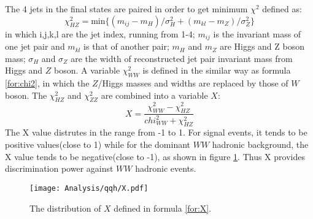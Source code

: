 The 4 jets in the final states are paired in order to get minimum $\chi^2$ defined as:
\begin{equation}
     \chi^2_{HZ} = \mathrm{min}\{(m_{ij}-m_H)/\sigma^2_{H} + (m_{kl}-m_Z)/\sigma^2_{Z} \}
     \label{for:chi2}
\end{equation}
in which i,j,k,l are the jet index, running from 1-4; $m_{ij}$ is the invariant mass of one jet pair and $m_{kl}$ is that of another pair; $m_H$ and $m_Z$ are Higgs and Z boson mass; $\sigma_H$ and $\sigma_Z$ are the width of reconstructed jet pair invariant mass from Higgs and  $Z$ boson. A variable $\chi^2_{WW}$ is defined in the similar way as formula \ref{for:chi2}, in which the $Z$/Higgs masses and widths are replaced by those of $W$ boson. The $\chi^2_{HZ}$ and $\chi^2_{ZZ}$ are combined into a variable $X$:
\begin{equation}
  X = \dfrac{\chi^2_{WW}-\chi^2_{HZ}}{chi^2_{WW}+\chi^2_{HZ}}
  \label{for:X}
\end{equation}
 The X value distrutes in the range from -1 to 1. For signal events, it tends to be positive 
 values(close to 1) while for the dominant $WW$ hadronic background, the X value tends to be negative(close to -1), as shown in figure \ref{fig:X}. Thus X provides discrimination power against $WW$ hadronic events.
 \begin{figure}
 \label{fig:X}
 \centering
 \texttt{[image: Analysis/qqh/X.pdf]}
 \caption{The distribution of $X$ defined in formula \ref{for:X}.}
 \end{figure}
\par

